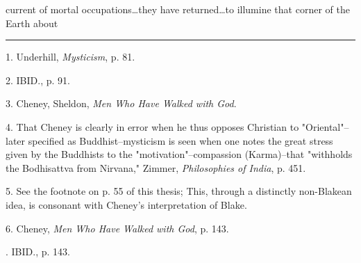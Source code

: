 current of mortal occupations\dots they have returned\dots to
illumine that corner of the Earth about\linebreak
\null\par
\vspace*{-\baselineskip}
\vspace*{\fill}
\noindent\rule{0.25\textwidth}{0.4pt}\par
1. Underhill, \textit{Mysticism}, p. 81.\par
2. IBID., p. 91.\par
3. Cheney, Sheldon, \textit{Men Who Have Walked with God}.\par
4. That Cheney is clearly in error when he thus opposes
Christian to "Oriental"--later specified as Buddhist--mysticism
is seen when one notes the great stress given by
the Buddhists to the "motivation"--compassion (Karma)--that
"withholds the Bodhisattva from Nirvana," Zimmer,
\textit{Philosophies of India}, p. 451.\par
5. See the footnote on p. 55 of this thesis; This, through a distinctly
non-Blakean idea, is consonant with Cheney's interpretation of Blake.\par
6. Cheney, \textit{Men Who Have Walked with God}, p. 143.\par
[7, 8]. IBID., p. 143.\par

\newpage


{}

